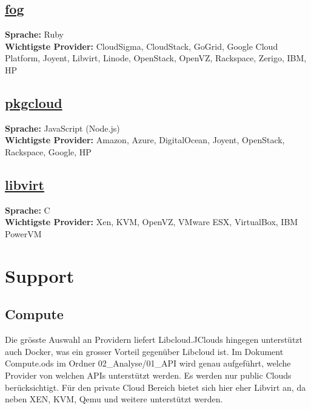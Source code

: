 \subsection{\href{https://github.com/fog/fog/blob/master/lib/fog/openstack/docs/getting_started.md}{fog}}
\textbf{Sprache: }Ruby\\
\textbf{Wichtigste Provider: }CloudSigma, CloudStack, GoGrid, Google Cloud Platform, Joyent, 
Libvirt, Linode, OpenStack, OpenVZ, Rackspace, Zerigo, IBM, HP\\

\subsection{\href{https://github.com/pkgcloud/pkgcloud}{pkgcloud}}
\textbf{Sprache: }JavaScript (Node.js)\\
\textbf{Wichtigste Provider: }Amazon, Azure, DigitalOcean, Joyent, OpenStack, Rackspace, Google, HP\\

\subsection{\href{http://http://libvirt.org/}{libvirt}}
\textbf{Sprache: }C\\
\textbf{Wichtigste Provider: }Xen, KVM, OpenVZ, VMware ESX, VirtualBox, IBM PowerVM\\

\newpage

\section{Support}
\subsection{Compute}
Die grösste Auswahl an Providern liefert Libcloud.JClouds hingegen 
unterstützt auch Docker, was ein grosser Vorteil gegenüber Libcloud ist. Im 
Dokument Compute.ods im Ordner 02\_Analyse\//01\_API wird genau aufgeführt, 
welche Provider von welchen APIs unterstützt werden. Es werden nur public Clouds berücksichtigt.
Für den private Cloud Bereich bietet sich hier eher Libvirt an, da neben XEN, 
KVM, Qemu und weitere unterstützt werden.

